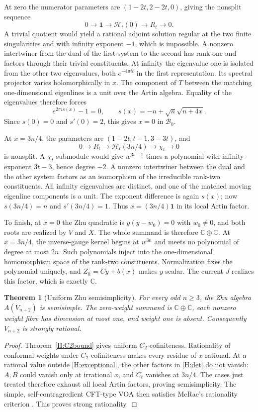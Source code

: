 \documentclass[11pt]{article}
\newtheorem{theorem}{Theorem}[section]
\newcommand{\C}{\mathbb C}\newcommand{\Q}{\mathbb Q}\newcommand{\Z}{\mathbb Z}
\newcommand{\one}{\mathbf1}\newcommand{\D}{\mathcal D}\newcommand{\Dcat}{\mathcal D}
\numberwithin{equation}{section}
\begin{document}
At zero the numerator parameters are $(1-2t,2-2t,0)$, giving the nonsplit sequence
\[
0\longrightarrow\one\longrightarrow\mathcal H_t(0)
\longrightarrow R_t\longrightarrow0.
\]
A trivial quotient would yield a rational adjoint solution regular at the two finite singularities and with infinity exponent $-1$, which is impossible. A nonzero intertwiner from the dual of the first system to the second has rank one and factors through their trivial constituents. At infinity the eigenvalue one is isolated from the other two eigenvalues, both $e^{-4\pi it}$ in the first representation. Its spectral projector varies holomorphically in $x$. The component of $T$ between the matching one-dimensional eigenlines is a unit over the Artin algebra. Equality of the eigenvalues therefore forces
\[
e^{2\pi i s(x)}-1=0,\qquad
s(x)=-n+\sqrt n\sqrt{n+4x}.
\]
Since $s(0)=0$ and $s'(0)=2$, this gives $x=0$ in $\mathcal B_0$.

At $x=3n/4$, the parameters are $(1-2t,t-1,3-3t)$, and
\[
0\longrightarrow R_t\longrightarrow\mathcal H_t(3n/4)
\longrightarrow\chi_t\longrightarrow0
\]
is nonsplit. A $\chi_t$ submodule would give $w^{3t-1}$ times a polynomial with infinity exponent $3t-3$, hence degree $-2$. A nonzero intertwiner between the dual and the other system factors as an isomorphism of the irreducible rank-two constituents. All infinity eigenvalues are distinct, and one of the matched moving eigenline components is a unit. The exponent difference is again $s(x)$; now $s(3n/4)=n$ and $s'(3n/4)=1$. Thus $x=(3n/4)\one$ in its local Artin factor.

To finish, at $x=0$ the Zhu quadratic is $y(y-w_0)=0$ with $w_0\ne0$, and both roots are realized by $V$ and $X$. The whole summand is therefore $\C\oplus\C$. At $x=3n/4$, the inverse-gauge kernel begins at $w^{3n}$ and meets no polynomial of degree at most $2n$. Such polynomials inject into the one-dimensional homomorphism space of the rank-two constituents. Normalization fixes the polynomial uniquely, and $Z_h=Cy+b(x)$ makes $y$ scalar. The current $J$ realizes this factor, which is exactly $\C$.

\begin{theorem}[Uniform Zhu semisimplicity]\label{H:Zhuconclusion}
For every odd $n\geq3$, the Zhu algebra $A(V_{n+2})$ is semisimple. The zero-weight summand is $\C\oplus\C$, each nonzero weight fibre has dimension at most one, and weight one is absent. Consequently $V_{n+2}$ is strongly rational.
\end{theorem}
\begin{proof}
Theorem~\ref{H:C2bound} gives uniform $C_2$-cofiniteness. Rationality of conformal weights under $C_2$-cofiniteness \cite[Corollary~5.10]{H:Miyamoto} makes every residue of $x$ rational. At a rational value outside \eqref{H:exceptional}, the other factors in \eqref{H:det} do not vanish: $A,B$ could vanish only at irrational $x$, and $C_t$ vanishes at $3n/4$. The cases just treated therefore exhaust all local Artin factors, proving semisimplicity. The simple, self-contragredient CFT-type VOA then satisfies McRae's rationality criterion \cite[Main Theorem~3]{A:McR}. This proves strong rationality.
\end{proof}
\end{document}
